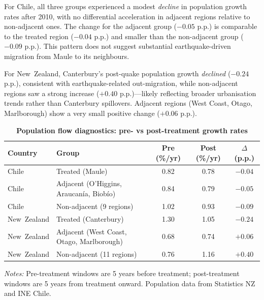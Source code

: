 \documentclass[12pt]{article}
\begin{document}
For Chile, all three groups experienced a modest \emph{decline} in population growth rates after 2010, with no differential acceleration in adjacent regions relative to non-adjacent ones. The change for the adjacent group ($-0.05$ p.p.) is comparable to the treated region ($-0.04$ p.p.) and smaller than the non-adjacent group ($-0.09$ p.p.). This pattern does not suggest substantial earthquake-driven migration from Maule to its neighbours.

For New~Zealand, Canterbury's post-quake population growth \emph{declined} ($-0.24$ p.p.), consistent with earthquake-related out-migration, while non-adjacent regions saw a strong increase ($+0.40$ p.p.)---likely reflecting broader urbanisation trends rather than Canterbury spillovers. Adjacent regions (West Coast, Otago, Marlborough) show a very small positive change ($+0.06$ p.p.).

\begin{table}[H]
\centering
\caption{\textbf{Population flow diagnostics: pre- vs post-treatment growth rates}}
\label{tab:pop_flow_diagnostics}
\small
\setlength{\tabcolsep}{5pt}
\begin{tabular}{llccc}
\toprule
\textbf{Country} & \textbf{Group} & \textbf{Pre (\%/yr)} & \textbf{Post (\%/yr)} & \textbf{$\Delta$ (p.p.)} \\
\midrule
Chile & Treated (Maule)      & 0.82 & 0.78 & $-0.04$ \\
Chile & Adjacent (O'Higgins, Araucanía, Biobío) & 0.84 & 0.79 & $-0.05$ \\
Chile & Non-adjacent (9 regions) & 1.02 & 0.93 & $-0.09$ \\
\midrule
New~Zealand & Treated (Canterbury) & 1.30 & 1.05 & $-0.24$ \\
New~Zealand & Adjacent (West Coast, Otago, Marlborough) & 0.68 & 0.74 & $+0.06$ \\
New~Zealand & Non-adjacent (11 regions) & 0.76 & 1.16 & $+0.40$ \\
\bottomrule
\end{tabular}
\begin{minipage}{0.95\textwidth}\footnotesize\vspace{1ex}
\textit{Notes:} Pre-treatment windows are 5 years before treatment; post-treatment windows are 5 years from treatment onward. Population data from Statistics NZ and INE Chile.
\end{minipage}
\end{table}
\end{document}
